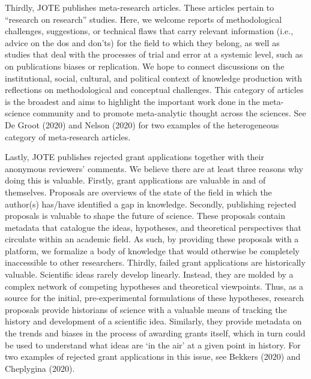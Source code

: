 \documentclass[twocolumn, serif]{jote-article}
\begin{document}
{{{{{{{{{Thirdly, JOTE publishes meta-research articles. These articles pertain to ``research on research'' studies. Here, we welcome reports of methodological challenges, suggestions, or technical flaws that carry relevant information (i.e., advice on the dos and don'ts) for the field to which they belong, as well as studies that deal with the processes of trial and error at a systemic level, such as on publications biases or replication. We hope to connect discussions on the institutional, social, cultural, and political context of knowledge production with reflections on methodological and conceptual challenges. This category of articles is the broadest and aims to highlight the important work done in the meta-science community and to promote meta-analytic thought across the sciences. See De Groot (2020) and Nelson (2020) for two examples of the heterogeneous category of meta-research articles.

\hypertarget{rejected-grant-applications}{%

Lastly, JOTE publishes rejected grant applications together with their anonymous reviewers' comments. We believe there are at least three reasons why doing this is valuable. Firstly, grant applications are valuable in and of themselves. Proposals are overviews of the state of the field in which the author(s) has/have identified a gap in knowledge.
Secondly, publishing rejected proposals is valuable to shape the future of science. These proposals contain metadata that catalogue the ideas, hypotheses, and theoretical perspectives that circulate within an academic field. As such, by providing these proposals with a platform, we formalize a body of knowledge that would otherwise be completely inaccessible to other researchers. Thirdly, failed grant applications are historically valuable. Scientific ideas rarely develop linearly.
Instead, they are molded by a complex network of competing hypotheses and theoretical viewpoints. Thus, as a source for the initial, pre-experimental formulations of these hypotheses, research proposals provide historians of science with a valuable means of tracking the history and development of a scientific idea. Similarly, they provide metadata on the trends and biases in the process of awarding grants itself, which in turn could be used to understand what ideas are `in the air' at a given point in history. For two examples of rejected grant applications in this issue, see Bekkers (2020) and Cheplygina (2020).

}}}}}}}}}}
\end{document}
